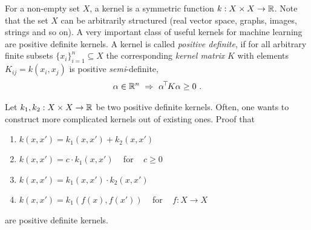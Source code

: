 

For a non-empty set $X$, a kernel is a symmetric function
$k: X \times X \to {\mathbb{R}}$. Note that the set
$X$ can be arbitrarily structured (real vector space, graphs,
images, strings and so on). A very important class of useful kernels
for machine learning are positive definite kernels. A kernel is
called \emph{positive definite}, if for all arbitrary finite subsets
$\{x_i\}_{i=1}^n \subseteq X$ the corresponding
\emph{kernel matrix} $K$ with elements $K_{ij} = k(x_i,x_j)$ is
positive \emph{semi}-definite,
\begin{align}
\alpha \in{\mathbb{R}}^n ~ \Rightarrow ~ \alpha^{\!\top\!} K\alpha \ge 0 ~.
\end{align}

Let $k_1,k_2: X\times X \to {\mathbb{R}}$ be two positive definite
kernels. Often, one wants to construct more complicated kernels out of
existing ones. Proof that
\begin{enumerate}
\item $k(x,x') = k_1(x,x') + k_2(x,x')$
\item $k(x,x') = c\cdot k_1(x,x')$ ~ for ~ $c \ge 0$
\item $k(x,x') = k_1(x,x') \cdot k_2(x,x')$
\item $k(x,x') = k_1(f(x),f(x'))$ ~ for ~ $f:X\to X$
\end{enumerate}
are positive definite kernels.


